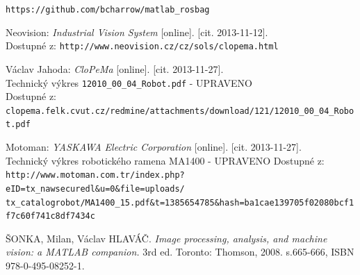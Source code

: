 \documentclass[10pt,a4paper,titlepage,oneside]{report}
\begin{document}
\begin{thebibliography}{00}
\verb|https://github.com/bcharrow/matlab_rosbag|

   Neovision:
    \emph{Industrial Vision System} [online]. [cit. 2013-11-12].\\
    Dostupné z: \verb|http://www.neovision.cz/cz/sols/clopema.html|    

   Václav Jahoda:
    \emph{CloPeMa} [online]. [cit. 2013-11-27].\\
    Technický výkres \verb|12010_00_04_Robot.pdf| - UPRAVENO\\
    Dostupné z: \verb|clopema.felk.cvut.cz/redmine/attachments/download/121/12010_00_04_Robot.pdf|    

   Motoman:
    \emph{YASKAWA Electric Corporation} [online]. [cit. 2013-11-27].\\
    Technický výkres robotického ramena MA1400 - UPRAVENO
    Dostupné z: \verb|http://www.motoman.com.tr/index.php?eID=tx_nawsecuredl&u=0&file=uploads/|\\
    \verb|tx_catalogrobot/MA1400_15.pdf&t=1385654785&hash=ba1cae139705f02080bcf1f7c60f741c8df7434c|
    
   ŠONKA, Milan, Václav HLAVÁČ.
    \emph{Image processing, analysis, and machine vision: a MATLAB companion.} 3rd ed. Toronto: Thomson, 2008. s.665-666, ISBN 978-0-495-08252-1. 

\end{thebibliography}
\end{document}
